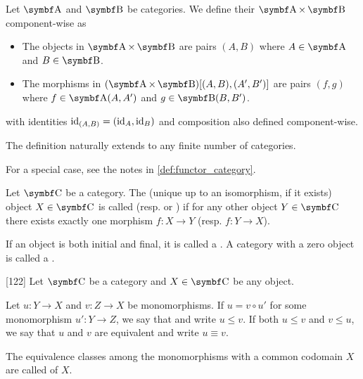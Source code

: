 \begin{definition}\label{def:product_category}\cite[exercise 1.1.14]{Leinster2014}
  Let \( \Bold A \) and \( \Bold B \) be categories. We define their  \( \Bold A \times \Bold B \) component-wise as
  \begin{itemize}
    \item The objects in \( \Bold A \times \Bold B \) are pairs \( (A, B) \) where \( A \in \Bold A \) and \( B \in \Bold B \).
    \item The morphisms in \( (\Bold A \times \Bold B)[(A, B), (A', B')] \) are pairs \( (f, g) \) where \( f \in \Cat{A}(A, A') \) and \( g \in \Bold{B}(B, B') \).
  \end{itemize}
  with identities \( \operatorname{id}_{(A,B)} =(\operatorname{id}_A, \operatorname{id}_B) \) and composition also defined component-wise.

  The definition naturally extends to any finite number of categories.

  For a special case, see the notes in \cref{def:functor_category}.
\end{definition}

\begin{definition}\label{def:initial_final_objects}\cite[definitions 2.1.7]{Leinster2014}
  Let \( \Bold C \) be a category. The (unique up to an isomorphism, if it exists) object \( X \in \Bold C \) is called  (resp.  or ) if for any other object \( Y \in \Bold C \) there exists exactly one morphism \( f: X \to Y \) (resp. \( f: Y \to X \)).

  If an object is both initial and final, it is called a . A category with a zero object is called a .
\end{definition}

\begin{definition}\label{def:categorical_subobject}\cite{MacLane1994}[122]
  Let \( \Bold C \) be a category and \( X \in \Bold C \) be any object.

  Let \( u: Y \to X \) and \( v: Z \to X \) be monomorphisms. If \( u = v \circ u' \) for some monomorphism \( u': Y \to Z \), we say that  and write \( u \leq v \). If both \( u \leq v \) and \( v \leq u \), we say that \( u \) and \( v \) are equivalent and write \( u \equiv v \).

  The equivalence classes among the monomorphisms with a common codomain \( X \) are called  of \( X \).
\end{definition}
